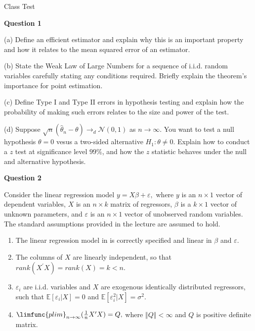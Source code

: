 \documentclass{article}
\begin{document}
\begin{center}
{\Large Class Test}
\end{center}

\textbf{Question 1}

(a) Define an efficient estimator and explain why this is an important
property and how it relates to the mean squared error of an estimator.

(b) State the Weak Law of Large Numbers for a sequence of i.i.d. random
variables carefully stating any conditions required. Briefly explain the
theorem's importance for point estimation.

(c) Define Type I and Type II errors in hypothesis testing and explain how
the probability of making such errors relates to the size and power of the
test.

(d) Suppose $\sqrt{n}\left( \hat{\theta}_{n}-\theta \right) \rightarrow _{d}%
\mathcal{N}\left( 0,1\right) $ as $n\rightarrow \infty .$ You want to test a
null hypothesis $\theta =0$ vesus a two-sided alternative $H_{1}:\theta \neq
0.$ Explain how to conduct a $z$ test at significance level $99\%$, and how
the $z$ statistic behaves under the null and alternative hypothesis.

\bigskip

\textbf{Question 2}

Consider the linear regression model $y=X\beta +\varepsilon ,$ where $y$ is
an $n\times 1$ vector of dependent variables, $X$ is an $n\times k$ matrix
of regressors, $\beta $ is a $k\times 1$ vector of unknown parameters, and $%
\varepsilon $ is an $n\times 1$ vector of unobserved random variables. The
standard assumptions provided in the lecture are assumed to hold.

\begin{enumerate}
\item The linear regression model in is correctly specified and linear in $%
\beta $ and $\varepsilon .$

\item The columns of $X$ are linearly independent, so that $rank(X^{\prime
}X)=rank(X)=k<n.$

\item $\varepsilon _{i}$ are i.i.d. variables and $X$ are exogenous
identically distributed regressors, such that $\mathbb{E}[\varepsilon
_{i}|X]=0$ and $\mathbb{E}[\varepsilon _{i}^{2}|X]=\sigma ^{2}.$

\item $\limfunc{plim}_{n\rightarrow \infty }(\frac{1}{n}X^{\prime }X)=Q,$
where $\left\Vert Q\right\Vert <\infty $ and $Q$ is positive definite matrix.
\end{enumerate}
\end{document}
